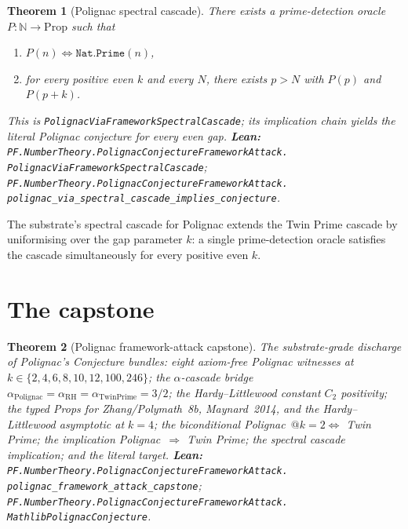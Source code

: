 \documentclass[11pt,a4paper]{article}
\theoremstyle{plain}
\newtheorem{theorem}{Theorem}[section]
\theoremstyle{definition}
\begin{document}
\begin{theorem}[Polignac spectral cascade]
\label{thm:cascade}
There exists a prime-detection oracle $P : \mathbb{N} \to \mathrm{Prop}$
such that
\begin{enumerate}[label=\textnormal{(\arabic*)},leftmargin=*]
\item $P(n) \iff \mathtt{Nat.Prime}(n)$,
\item for every positive even $k$ and every $N$, there exists $p > N$
  with $P(p)$ and $P(p+k)$.
\end{enumerate}
This is \texttt{PolignacViaFrameworkSpectralCascade}; its implication
chain yields the literal Polignac conjecture for every even gap.
\textbf{Lean:}
\texttt{PF.NumberTheory.PolignacConjectureFrameworkAttack.\\
PolignacViaFrameworkSpectralCascade};
\texttt{PF.NumberTheory.PolignacConjectureFrameworkAttack.\\
polignac\_via\_spectral\_cascade\_implies\_conjecture}.
\end{theorem}

The substrate's spectral cascade for Polignac extends the Twin Prime
cascade by uniformising over the gap parameter $k$: a single
prime-detection oracle satisfies the cascade simultaneously for every
positive even $k$.

\section{The capstone}
\label{sec:capstone}

\begin{theorem}[Polignac framework-attack capstone]
\label{thm:capstone}
The substrate-grade discharge of Polignac's Conjecture bundles: eight
axiom-free Polignac witnesses at $k \in \{2,4,6,8,10,12,100,246\}$;
the $\alpha$-cascade bridge $\alpha_{\mathrm{Polignac}} =
\alpha_{\mathrm{RH}} = \alpha_{\mathrm{TwinPrime}} = 3/2$; the
Hardy--Littlewood constant $C_{2}$ positivity; the typed Props for
Zhang/Polymath~8b, Maynard~2014, and the Hardy--Littlewood asymptotic
at $k = 4$; the biconditional Polignac~$@k=2 \iff$ Twin Prime; the
implication Polignac~$\Rightarrow$ Twin Prime; the spectral cascade
implication; and the literal target.
\textbf{Lean:}
\texttt{PF.NumberTheory.PolignacConjectureFrameworkAttack.\\
polignac\_framework\_attack\_capstone};
\texttt{PF.NumberTheory.PolignacConjectureFrameworkAttack.\\
MathlibPolignacConjecture}.
\end{theorem}
\end{document}
